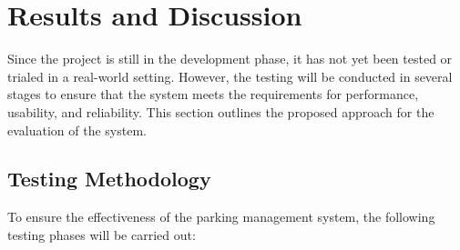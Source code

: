 \section{Results and Discussion}

Since the project is still in the development phase, it has not yet been tested or trialed in a real-world setting. However, the testing will be conducted in several stages to ensure that the system meets the requirements for performance, usability, and reliability. This section outlines the proposed approach for the evaluation of the system.

\subsection{Testing Methodology}

To ensure the effectiveness of the parking management system, the following testing phases will be carried out:

